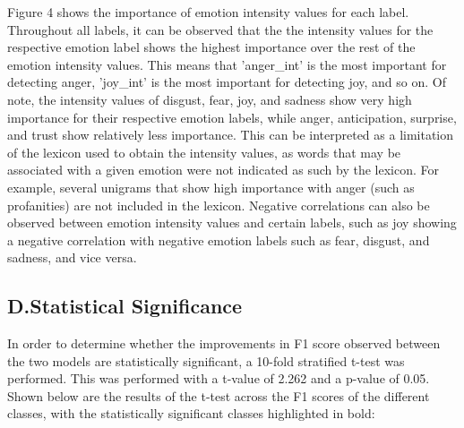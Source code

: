 \documentclass{icsthesis}
\begin{document}
\begin{mainmatter}
                Figure 4 shows the importance of emotion intensity values for each label. Throughout all labels, it can be observed that the the intensity values for the respective emotion label shows the highest importance over the rest of the emotion intensity values. This means that 'anger\_int' is the most important for detecting anger, 'joy\_int' is the most important for detecting joy, and so on. Of note, the intensity values of disgust, fear, joy, and sadness show very high importance for their respective emotion labels, while anger, anticipation, surprise, and trust show relatively less importance. This can be interpreted as a limitation of the lexicon used to obtain the intensity values, as words that may be associated with a given emotion were not indicated as such by the lexicon. For example, several unigrams that show high importance with anger (such as profanities) are not included in the lexicon. Negative correlations can also be observed between emotion intensity values and certain labels, such as joy showing a negative correlation with negative emotion labels such as fear, disgust, and sadness, and vice versa.
                
            \subsection{D.\hspace{0.5cm}Statistical Significance}
                
                In order to determine whether the improvements in F1 score observed between the two models are statistically significant, a 10-fold stratified t-test was performed. This was performed with a t-value of 2.262 and a p-value of 0.05. Shown below are the results of the t-test across the F1 scores of the different classes, with the statistically significant classes highlighted in bold:
                

\end{mainmatter}
\end{document}

